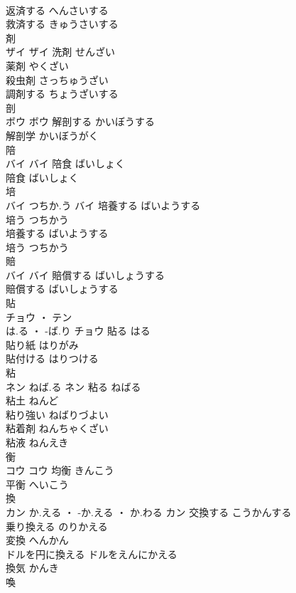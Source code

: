 \documentclass[8pt]{extreport}
\begin{document}
\begin{CJK}{UTF8}{min}
\\	返済する	へんさいする	
\\	救済する	きゅうさいする	
\\	剤	
\\	ザイ		ザイ	洗剤	せんざい	
\\	薬剤	やくざい	
\\	殺虫剤	さっちゅうざい	
\\	調剤する	ちょうざいする	
\\	剖	
\\	ボウ		ボウ	解剖する	かいぼうする	
\\	解剖学	かいぼうがく	
\\	陪	
\\	バイ		バイ	陪食	ばいしょく	
\\	陪食	ばいしょく	
\\	培	
\\	バイ	つちか.う	バイ	培養する	ばいようする	
\\	培う	つちかう	
\\	培養する	ばいようする	
\\	培う	つちかう	
\\	賠	
\\	バイ		バイ	賠償する	ばいしょうする	
\\	賠償する	ばいしょうする	
\\	貼	
\\	チョウ ・ テン
\\	は.る ・ -ば.り	チョウ	貼る	はる	
\\	貼り紙	はりがみ	
\\	貼付ける	はりつける	
\\	粘	
\\	ネン	ねば.る	ネン	粘る	ねばる	
\\	粘土	ねんど	
\\	粘り強い	ねばりづよい	
\\	粘着剤	ねんちゃくざい	
\\	粘液	ねんえき	
\\	衡	
\\	コウ		コウ	均衡	きんこう	
\\	平衡	へいこう	
\\	換	
\\	カン	か.える ・ -か.える ・ か.わる	カン	交換する	こうかんする	
\\	乗り換える	のりかえる	
\\	変換	へんかん	
\\	ドルを円に換える	ドルをえんにかえる	
\\	換気	かんき	
\\	喚	

\end{CJK}
\end{document}
